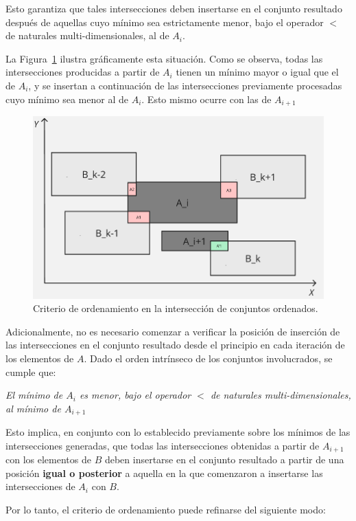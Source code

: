 Esto garantiza que tales intersecciones deben insertarse en el conjunto resultado después de aquellas cuyo mínimo sea estrictamente menor, bajo el operador $<$ de naturales multi-dimensionales, al de $A_i$. 

La Figura~\ref{fig:enter-label} ilustra gráficamente esta situación. Como se observa, todas las intersecciones producidas a partir de $A_i$ tienen un mínimo mayor o igual que el de $A_i$, y se insertan a continuación de las intersecciones previamente procesadas cuyo mínimo sea menor al de $A_i$. Esto mismo ocurre con las de $A_{i+1}$

\begin{figure}[h]
    \centering
    \includegraphics[width=0.7\linewidth]{figures/Optimazaciones/Interseccion/crit ordenamiento.png}
    \caption{Criterio de ordenamiento en la intersección de conjuntos ordenados.}
    \label{fig:enter-label}
\end{figure}

Adicionalmente, no es necesario comenzar a verificar la posición de inserción de las intersecciones en el conjunto resultado desde el principio en cada iteración de los elementos de $A$. Dado el orden intrínseco de los conjuntos involucrados, se cumple que:
\begin{center}
    \textit{El mínimo de $A_i$ es menor, bajo el operador $<$ de naturales multi-dimensionales, al mínimo de $A_{i+1}$}
\end{center}

Esto implica, en conjunto con lo establecido previamente sobre los mínimos de las intersecciones generadas, que todas las intersecciones obtenidas a partir de $A_{i+1}$ con los elementos de $B$ deben insertarse en el conjunto resultado a partir de una posición \textbf{igual o posterior} a aquella en la que comenzaron a insertarse las intersecciones de $A_i$ con $B$.

Por lo tanto, el criterio de ordenamiento puede refinarse del siguiente modo:



